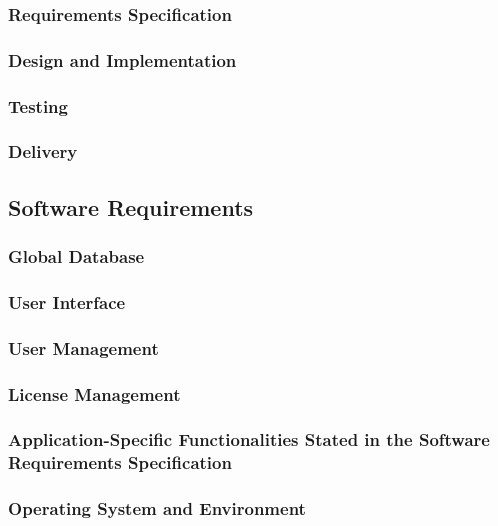 \documentclass[11pt]{article}
\begin{document}
\subsubsection{Requirements Specification}

\subsubsection{Design and Implementation}

\subsubsection{Testing}

\subsubsection{Delivery}

\subsection{Software Requirements}

\subsubsection{Global Database}

\subsubsection{User Interface}

\subsubsection{User Management}

\subsubsection{License Management}

\subsubsection{Application-Specific Functionalities Stated in the Software Requirements
Specification}

\subsubsection{Operating System and Environment}
\end{document}
